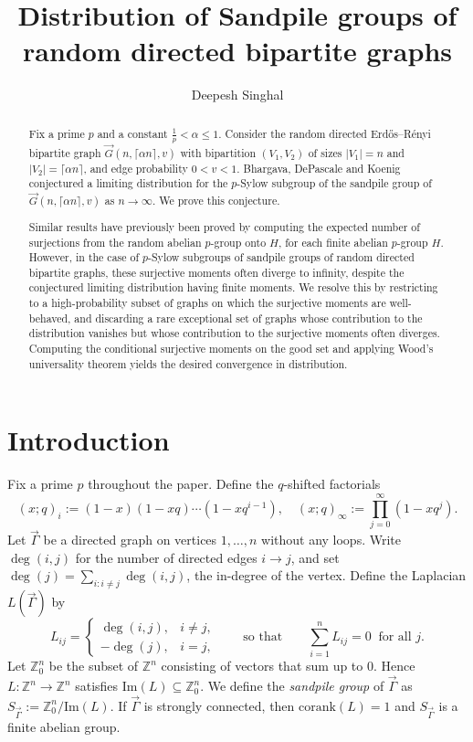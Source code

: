 \documentclass[12pt]{amsart}
\theoremstyle{definition}
\newcommand{\qpochn}[3]{\left(#1;#2\right)_{#3}}
\newcommand{\im}{\text{Im}}
\newcommand{\Z}{\mathbb{Z}}
\newcommand{\ceil}[1]{\lceil#1\rceil}
\begin{document}
\title{Distribution of Sandpile groups of random directed bipartite graphs}
\author{Deepesh Singhal}


\begin{abstract}
Fix a prime $p$ and a constant $\frac{1}{p}<\alpha\leq 1$. Consider the random directed Erd\H{o}s--R\'enyi bipartite graph $\vec G(n,\ceil{\alpha n} ,v)$ with bipartition $(V_1,V_2)$ of sizes $|V_1|=n$ and $|V_2|=\ceil{\alpha n}$, and edge probability $0<v<1$. Bhargava, DePascale and Koenig \cite{bhargava2023rank} conjectured a limiting distribution for the $p$-Sylow subgroup of the sandpile group of $\vec G(n,\ceil{\alpha n},v)$ as $n\to\infty$.
We prove this conjecture.

Similar results have previously been proved by computing the expected number of surjections from the random abelian $p$-group onto $H$, for each finite abelian $p$-group $H$.
However, in the case of $p$-Sylow subgroups of sandpile groups of random directed bipartite graphs, these surjective moments often diverge to infinity, despite the conjectured limiting distribution having finite moments.
We resolve this by restricting to a high-probability subset of graphs on which the surjective moments are well-behaved, and discarding a rare exceptional set of graphs whose contribution to the distribution vanishes but whose contribution to the surjective moments often diverges. Computing the conditional surjective moments on the good set and applying Wood's universality theorem yields the desired convergence in distribution.
\end{abstract}


\maketitle

\section{Introduction}
Fix a prime $p$ throughout the paper. Define the $q$-shifted factorials
\[
\qpochn{x}{q}{i}
:= (1-x) (1-xq) \cdots (1-xq^{i-1}),
\quad
\qpochn{x}{q}{\infty} 
:= \prod_{j=0}^{\infty} (1-xq^j).
\]
Let $\vec\Gamma$ be a directed graph on vertices $1,\dots,n$ without any loops.  Write $\deg(i,j)$ for the number of directed edges $i\to j$, and set $\deg(j)=\sum_{i:i\neq j}\deg(i,j)$, the in-degree of the vertex.
Define the Laplacian $L(\vec\Gamma)$ by
\[
L_{ij}=\begin{cases}
\deg(i,j), & i\neq j,\\
-\deg(j), & i=j,
\end{cases}
\qquad\text{so that}\qquad
\sum_{i=1}^n L_{ij}=0\ \text{ for all }j.
\]
Let $\Z_0^n$ be the subset of $\Z^n$ consisting of vectors that sum up to $0$.
Hence $L:\Z^n\to\Z^n$ satisfies $\im(L)\subseteq \Z_0^n$.
We define the \emph{sandpile group} of $\vec{\Gamma}$ as $S_{\vec\Gamma}:=\Z_0^n/\im(L)$. 
If $\vec\Gamma$ is strongly connected, then $\text{corank}(L)=1$ and $S_{\vec\Gamma}$ is a finite abelian group.
\end{document}
